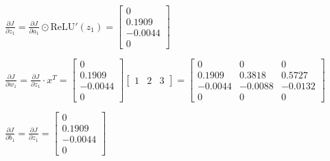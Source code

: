 $
\frac{\partial J}{\partial z_1} = \frac{\partial J}{\partial a_1} \odot \text{ReLU}'(z_1) =
\begin{bmatrix}
0 \\ 0.1909 \\ -0.0044 \\ 0
\end{bmatrix}
$

$
\frac{\partial J}{\partial w_1} = \frac{\partial J}{\partial z_1} \cdot x^T =
\begin{bmatrix}
0 \\ 0.1909 \\ -0.0044 \\ 0
\end{bmatrix}
\begin{bmatrix}
1 & 2 & 3
\end{bmatrix}
=
\begin{bmatrix}
0 & 0 & 0 \\
0.1909 & 0.3818 & 0.5727 \\
-0.0044 & -0.0088 & -0.0132 \\
0 & 0 & 0
\end{bmatrix}
$

$
\frac{\partial J}{\partial b_1} = \frac{\partial J}{\partial z_1} =
\begin{bmatrix}
0 \\ 0.1909 \\ -0.0044 \\ 0
\end{bmatrix}
$
\setRTL

